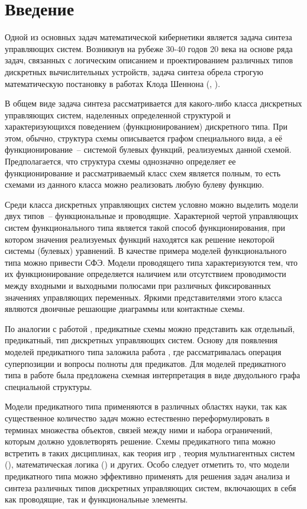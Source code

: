 \documentclass[12pt]{article}
\begin{document}
\section{Введение}
\label{beginning}
Одной из основных задач математической кибернетики является задача синтеза управляющих систем.
Возникнув на рубеже 30-40 годов 20 века на основе ряда задач, связанных с логическим описанием и проектированием 
различных типов дискретных вычислительных устройств, задача синтеза обрела строгую математическую постановку в работах
Клода Шеннона (\cite{Shannon}, \cite{Shannon2}).

В общем виде задача синтеза рассматривается для какого-либо класса дискретных управляющих систем, 
наделенных определенной структурой
и характеризующихся поведением (функционированием) дискретного типа. 
При этом, обычно, структура схемы описывается графом специального
вида, а её функционирование~-- системой булевых функций, реализуемых
данной схемой. Предполагается, что структура схемы однозначно определяет ее функционирование и
рассматриваемый класс схем является полным, то есть схемами из данного класса можно реализовать любую булеву
функцию.

Среди класса дискретных управляющих систем условно можно выделить модели двух типов~-- функциональные и проводящие. 
Характерной чертой управляющих систем функционального типа является такой способ
функционирования, при котором значения реализуемых функций находятся как
решение некоторой системы (булевых) уравнений. В качестве примера моделей функционального типа
можно привести СФЭ. 
Модели проводящего типа характеризуются тем, что их 
функционирование определяется наличием или отсутствием проводимости между
входными и выходными полюсами при различных фиксированных значениях управляющих переменных. Яркими представителями 
этого класса являются двоичные решающие диаграммы или контактные схемы.

По аналогии с работой \cite{Shu11}, предикатные схемы можно представить как отдельный, предикатный, 
тип дискретных управляющих систем.
Основу для появления моделей предикатного типа заложила работа \cite{Bodnar4uk_f},
где рассматривалась операция суперпозиции и вопросы полноты для предикатов. 
Для моделей предикатного типа в работе \cite{graph_first} была предложена схемная интерпретация
в виде двудольного графа специальной структуры.

Модели предикатного типа применяются в различных областях науки, так как существенное количество задач 
можно естественно переформулировать в терминах множества объектов, связей между ними и набора ограничений, которым
должно удовлетворять решение. Схемы предикатного типа можно встретить в таких дисциплинах, как теория игр \cite{gt}, 
теория мультиагентных систем (\cite{mas}), математическая логика (\cite{ml}) и других. 
Особо следует отметить то, что модели предикатного типа можно эффективно применять для 
решения задач анализа и синтеза различных типов дискретных управляющих систем, 
включающих в себя как проводящие, так и функциональные элементы.  
\end{document}
